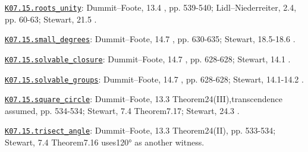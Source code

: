 \par\smallskip\noindent\hypertarget{src:K07.15.roots_unity}{}\label{src:K07.15.roots_unity}\hyperref[K07.15.roots_unity]{\texttt{K07.15.roots\_unity}}: Dummit--Foote, 13.4 , pp. 539-540; Lidl--Niederreiter, 2.4, pp. 60-63; Stewart, 21.5 .
\par\smallskip\noindent\hypertarget{src:K07.15.small_degrees}{}\label{src:K07.15.small_degrees}\hyperref[K07.15.small_degrees]{\texttt{K07.15.small\_degrees}}: Dummit--Foote, 14.7 , pp. 630-635; Stewart, 18.5-18.6 .
\par\smallskip\noindent\hypertarget{src:K07.15.solvable_closure}{}\label{src:K07.15.solvable_closure}\hyperref[K07.15.solvable_closure]{\texttt{K07.15.solvable\_closure}}: Dummit--Foote, 14.7 , pp. 628-628; Stewart, 14.1 .
\par\smallskip\noindent\hypertarget{src:K07.15.solvable_groups}{}\label{src:K07.15.solvable_groups}\hyperref[K07.15.solvable_groups]{\texttt{K07.15.solvable\_groups}}: Dummit--Foote, 14.7 , pp. 628-628; Stewart, 14.1-14.2 .
\par\smallskip\noindent\hypertarget{src:K07.15.square_circle}{}\label{src:K07.15.square_circle}\hyperref[K07.15.square_circle]{\texttt{K07.15.square\_circle}}: Dummit--Foote, 13.3 Theorem24(III),transcendence assumed, pp. 534-534; Stewart, 7.4 Theorem7.17; Stewart, 24.3 .
\par\smallskip\noindent\hypertarget{src:K07.15.trisect_angle}{}\label{src:K07.15.trisect_angle}\hyperref[K07.15.trisect_angle]{\texttt{K07.15.trisect\_angle}}: Dummit--Foote, 13.3 Theorem24(II), pp. 533-534; Stewart, 7.4 Theorem7.16 uses120° as another witness.
